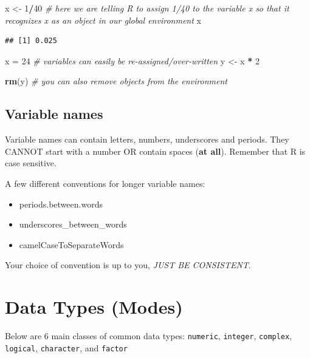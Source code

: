 \documentclass[
]{book}
\newenvironment{Shaded}{\begin{snugshade}}{\end{snugshade}}
\newcommand{\CommentTok}[1]{\textcolor[rgb]{0.56,0.35,0.01}{\textit{#1}}}
\newcommand{\DecValTok}[1]{\textcolor[rgb]{0.00,0.00,0.81}{#1}}
\newcommand{\FunctionTok}[1]{\textcolor[rgb]{0.13,0.29,0.53}{\textbf{#1}}}
\newcommand{\NormalTok}[1]{#1}
\newcommand{\OtherTok}[1]{\textcolor[rgb]{0.56,0.35,0.01}{#1}}
\newcommand{\SpecialCharTok}[1]{\textcolor[rgb]{0.81,0.36,0.00}{\textbf{#1}}}
\providecommand{\tightlist}{%
  \setlength{\itemsep}{0pt}\setlength{\parskip}{0pt}}
\begin{document}
\begin{Shaded}
\begin{Highlighting}[]
\NormalTok{x }\OtherTok{\textless{}{-}} \DecValTok{1}\SpecialCharTok{/}\DecValTok{40} \CommentTok{\# here we are telling R to assign 1/40 to the variable x so that it recognizes x as an object in our global environment}
\NormalTok{x }
\end{Highlighting}
\end{Shaded}

\begin{verbatim}
## [1] 0.025
\end{verbatim}

\begin{Shaded}
\begin{Highlighting}[]
\NormalTok{x }\OtherTok{=} \DecValTok{24} \CommentTok{\# variables can easily be re{-}assigned/over{-}written}
\NormalTok{y }\OtherTok{\textless{}{-}}\NormalTok{ x }\SpecialCharTok{*} \DecValTok{2}

\FunctionTok{rm}\NormalTok{(y) }\CommentTok{\# you can also remove objects from the environment}
\end{Highlighting}
\end{Shaded}

\subsection{Variable names}\label{variable-names}

Variable names can contain letters, numbers, underscores and periods.
They CANNOT start with a number OR contain spaces (\textbf{at all}). Remember that R is case sensitive.

A few different conventions for longer variable names:

\begin{itemize}
\tightlist
\item
  periods.between.words
\item
  underscores\_between\_words
\item
  camelCaseToSeparateWords
\end{itemize}

Your choice of convention is up to you, \emph{JUST BE CONSISTENT}.

\section{Data Types (Modes)}\label{data-types-modes}

Below are 6 main classes of common data types: \texttt{numeric}, \texttt{integer}, \texttt{complex}, \texttt{logical}, \texttt{character}, and \texttt{factor}
\end{document}
